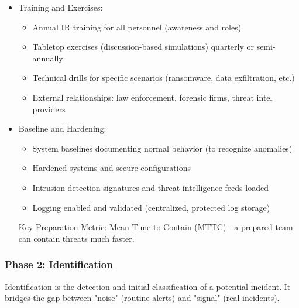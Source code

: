 \documentclass[10pt]{article}
\begin{document}
\begin{itemize}
\begin{itemize}
  	\item Network analysis tools (Wireshark, Zeek)
  	\item Ticketing system for incident tracking and workflow
  	\item Secure communication channels (encrypted email, secure chat)
  	\item Isolated network segment for investigation (forensic lab)
  \end{itemize}
  \item Training and Exercises:
  \begin{itemize}
  	\item Annual IR training for all personnel (awareness and roles)
  	\item Tabletop exercises (discussion-based simulations) quarterly or semi-annually
  	\item Technical drills for specific scenarios (ransomware, data exfiltration, etc.)
  	\item External relationships: law enforcement, forensic firms, threat intel providers
  \end{itemize}
  \item Baseline and Hardening:
  \begin{itemize}
  	\item System baselines documenting normal behavior (to recognize anomalies)
  	\item Hardened systems and secure configurations
  	\item Intrusion detection signatures and threat intelligence feeds loaded
  	\item Logging enabled and validated (centralized, protected log storage)
  \end{itemize}
Key Preparation Metric: Mean Time to Contain (MTTC) - a prepared team can contain threats much faster.
\end{itemize}

\subsubsection*{Phase 2: Identification}
Identification is the detection and initial classification of a potential incident. It bridges the gap between "noise" (routine alerts) and "signal" (real incidents).
\end{document}
